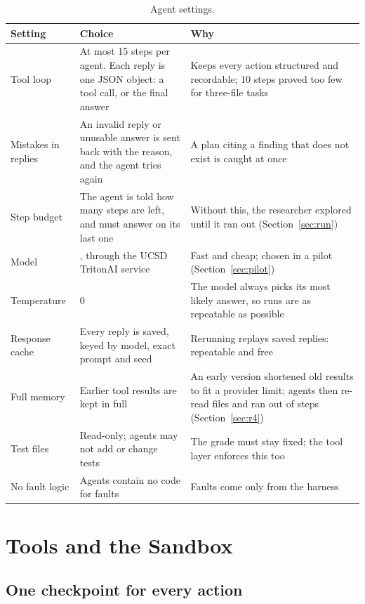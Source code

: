 \documentclass{article}
\newcommand{\code}[1]{\texttt{\detokenize{#1}}}
\begin{document}
\begin{table}[htbp]
\centering
\small
\caption{Agent settings.}
\label{tab:settings}
\begin{tabularx}{\linewidth}{@{}lLL@{}}
\toprule
Setting & Choice & Why \\
\midrule
Tool loop & At most 15 steps per agent. Each reply is one JSON object: a tool call, or the final answer & Keeps every action structured and recordable; 10 steps proved too few for three-file tasks \\
Mistakes in replies & An invalid reply or unusable answer is sent back with the reason, and the agent tries again & A plan citing a finding that does not exist is caught at once \\
Step budget & The agent is told how many steps are left, and must answer on its last one & Without this, the researcher explored until it ran out (Section~\ref{sec:run}) \\
Model & \code{api-glm-5.3-flash}, through the UCSD TritonAI service & Fast and cheap; chosen in a pilot (Section~\ref{sec:pilot}) \\
Temperature & 0 & The model always picks its most likely answer, so runs are as repeatable as possible \\
Response cache & Every reply is saved, keyed by model, exact prompt and seed & Rerunning replays saved replies: repeatable and free \\
Full memory & Earlier tool results are kept in full & An early version shortened old results to fit a provider limit; agents then re-read files and ran out of steps (Section~\ref{sec:r4}) \\
Test files & Read-only; agents may not add or change tests & The grade must stay fixed; the tool layer enforces this too \\
No fault logic & Agents contain no code for faults & Faults come only from the harness \\
\bottomrule
\end{tabularx}
\end{table}

\section{Tools and the Sandbox}
\label{sec:tools}

\subsection{One checkpoint for every action}
\end{document}
